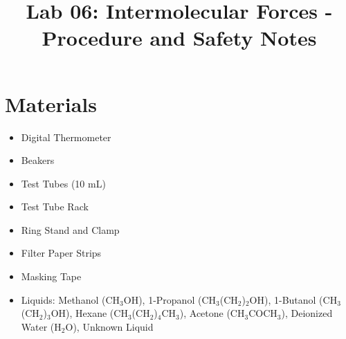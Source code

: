 \documentclass{article}
\title{Lab 06: Intermolecular Forces - Procedure and Safety Notes}
\author{}
\date{}
\begin{document}
\maketitle

\section*{Materials}
\begin{itemize}
    \item Digital Thermometer
    \item Beakers
    \item Test Tubes (10 mL)
    \item Test Tube Rack
    \item Ring Stand and Clamp
    \item Filter Paper Strips
    \item Masking Tape
    \item Liquids: Methanol (CH$_3$OH), 1-Propanol (CH$_3$(CH$_2$)$_2$OH), 1-Butanol (CH$_3$(CH$_2$)$_3$OH), Hexane (CH$_3$(CH$_2$)$_4$CH$_3$), Acetone (CH$_3$COCH$_3$), Deionized Water (H$_2$O), Unknown Liquid
\end{itemize}
\end{document}
